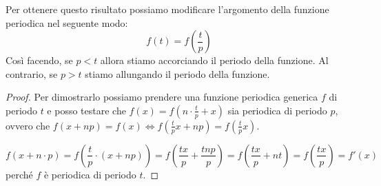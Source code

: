 Per ottenere questo risultato possiamo modificare l'argomento della funzione
periodica nel seguente modo:
\begin{equation}
    f(t) = f\left(\frac{t}{p}\right)
\end{equation}
Così facendo, se $p < t$ allora stiamo accorciando il periodo della funzione. Al
contrario, se $p > t$ stiamo allungando il periodo della funzione.
\begin{proof}
    Per dimostrarlo possiamo prendere una funzione periodica generica $f$ di
    periodo $t$ e posso testare che $f(x) = f\left( n \cdot \frac{t}{p} + x\right)$
    sia periodica di periodo $p$, ovvero che $f(x + np) = f(x) \iff
        f\left(\frac{t}{p}x + np\right) = f(\frac{t}{p}x)$.

    \begin{equation*}
        f\left(x + n \cdot p\right) = f\left(\frac{t}{p}\cdot (x + np)\right) =
        f\left(\frac{tx}{p} + \frac{tnp}{p}\right) = f\left(\frac{tx}{p} + nt\right)
        = f\left(\frac{tx}{p}\right) = f'(x)
    \end{equation*}
    perché $f$ è periodica di periodo $t$.
\end{proof}

